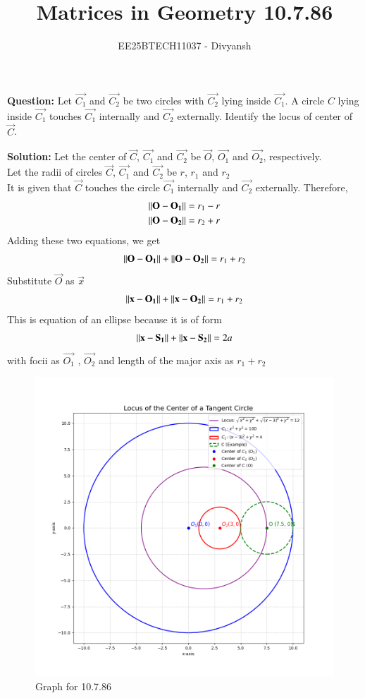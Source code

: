 \documentclass[journal,12pt,onecolumn]{IEEEtran}
\title{Matrices in Geometry 10.7.86}
\author{EE25BTECH11037 - Divyansh}
\theoremstyle{remark}
\begin{document}
\vspace{3cm}
\maketitle
{\let\newpage\relax\maketitle}
\textbf{Question: }
Let $\vec{C_1}$ and $\vec{C_2}$ be two circles with $\vec{C_2}$ lying inside $\vec{C_1}$. A circle $C$ lying inside $\vec{C_1}$ touches $\vec{C_1}$ internally and $\vec{C_2}$ externally. Identify the locus of center of $\vec{C}$.
\vspace{2mm}


\textbf{Solution:}
Let the center of $\vec{C}$, $\vec{C_1}$ and $\vec{C_2}$ be $\vec{O}$, $\vec{O_1}$ and $\vec{O_2}$, respectively.\\
Let the radii of circles $\vec{C}$, $\vec{C_1}$ and $\vec{C_2}$ be $r$, $r_1$ and $r_2$ \\
It is given that $\vec{C}$ touches the circle $\vec{C_1}$ internally and $\vec{C_2}$ externally. Therefore, 
\begin{align}
    \left\lVert\mathbf{O} - \mathbf{O_1}\right\rVert = r_1 - r\\
    \left\lVert\mathbf{O} - \mathbf{O_2}\right\rVert = r_2 + r
\end{align}
Adding these two equations, we get 
\begin{align}
    \left\lVert\mathbf{O} - \mathbf{O_1}\right\rVert + \left\lVert\mathbf{O} - \mathbf{O_2}\right\rVert = r_1 + r_2
\end{align}
Substitute $\vec{O}$ as $\vec{x}$
\begin{align}
    \left\lVert\mathbf{x} - \mathbf{O_1}\right\rVert + \left\lVert\mathbf{x} - \mathbf{O_2}\right\rVert = r_1 + r_2
\end{align}
This is equation of an ellipse because it is of form 
\begin{align}
    \left\lVert\mathbf{x} - \mathbf{S_1}\right\rVert + \left\lVert\mathbf{x} - \mathbf{S_2}\right\rVert = 2a
\end{align}
with focii  as $\vec{O_1}$ , $\vec{O_2}$ and length of the major axis as $r_1 + r_2$
\begin{figure}[H]
    \centering
    \includegraphics[width=0.7\columnwidth]{figs/1.png}
    \caption{Graph for 10.7.86}
    \label{fig:placeholder}
\end{figure}
\end{document}
